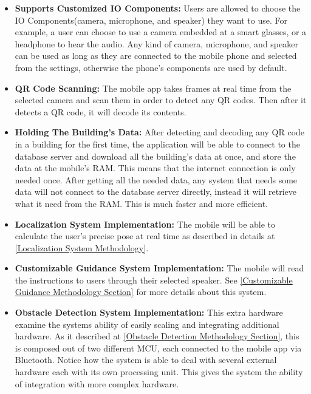 \begin{itemize}
	\item \textbf{Supports Customized IO Components:}
	Users are allowed to choose the IO Components(camera, microphone, and speaker) they want to use. For example, a user can choose to use a camera embedded at a smart glasses, or a headphone to hear the audio. Any kind of camera, microphone, and speaker can be used as long as they are connected to the mobile phone and selected from the settings, otherwise the phone's components are used by default.
	
	\item \textbf{QR Code Scanning:} 
	The mobile app takes frames at real time from the selected camera and scan them in order to detect any QR codes. Then after it detects a QR code, it will decode its contents.
	
	\item \textbf{Holding The Building's Data:} \label{Database connection from mobile}
	After detecting and decoding any QR code in a building for the first time, the application will be able to connect to the database server and download all the building's data at once, and store the data at the mobile's RAM. This means that the internet connection is only needed once. After getting all the needed data, any system that needs some data will not connect to the database server directly, instead it will retrieve what it need from the RAM. This is much faster and more efficient.
	
	\item \textbf{Localization System Implementation:} 
	The mobile will be able to calculate the user's precise pose at real time as described in details at \ref{Localization System Methodology}.
	
	\item \textbf{Customizable Guidance System Implementation:}
	The mobile will read the instructions to users through their selected speaker. See \ref{Customizable Guidance Methodology Section} for more details about this system.
	
	\item \textbf{Obstacle Detection System Implementation:}
	This extra hardware examine the systems ability of easily scaling and integrating additional hardware. As it described at \ref{Obstacle Detection Methodology Section}, this is composed out of two different MCU, each connected to the mobile app via Bluetooth. Notice how the system is able to deal with several external hardware each with its own processing unit. This gives the system the ability of integration with more complex hardware.
	

\end{itemize}
